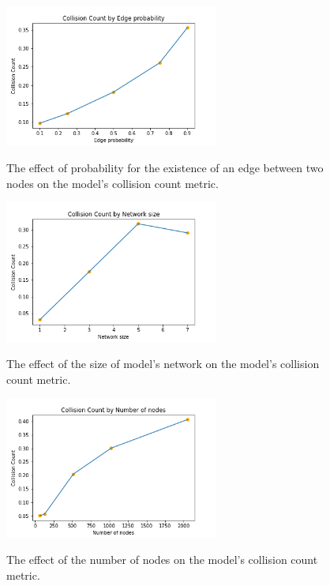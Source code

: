 \documentclass{article}
\begin{document}
\begin{figure}
    \begin{center}
        \includegraphics[width=7cm]{../figures/Collision_Count_edge_prob.png}\\
        \caption{The effect of probability for the existence of an edge between two nodes on the model's collision count metric.}
    \end{center}
\end{figure}    
\begin{figure}
    \begin{center}
        \includegraphics[width=7cm]{../figures/Collision_Count_network_size.png}\\
        \caption{The effect of the size of model's network on the model's collision count metric.}
    \end{center}
\end{figure}    
\begin{figure}
    \begin{center}
        \includegraphics[width=7cm]{../figures/Collision_Count_num_nodes.png}\\
        \caption{The effect of the number of nodes on the model's collision count metric.}
    \end{center}
\end{figure}    
\end{document}
